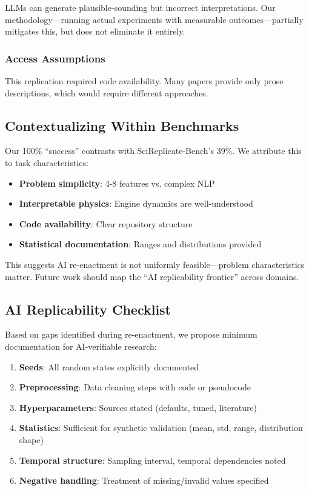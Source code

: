 \documentclass[conference]{IEEEtran}
\begin{document}
LLMs can generate plausible-sounding but incorrect interpretations. Our methodology---running actual experiments with measurable outcomes---partially mitigates this, but does not eliminate it entirely.

\subsubsection{Access Assumptions}

This replication required code availability. Many papers provide only prose descriptions, which would require different approaches.

\subsection{Contextualizing Within Benchmarks}

Our 100\% ``success'' contrasts with SciReplicate-Bench's 39\%. We attribute this to task characteristics:
\begin{itemize}
    \item \textbf{Problem simplicity}: 4-8 features vs. complex NLP
    \item \textbf{Interpretable physics}: Engine dynamics are well-understood
    \item \textbf{Code availability}: Clear repository structure
    \item \textbf{Statistical documentation}: Ranges and distributions provided
\end{itemize}

This suggests AI re-enactment is not uniformly feasible---problem characteristics matter. Future work should map the ``AI replicability frontier'' across domains.

\subsection{AI Replicability Checklist}

Based on gaps identified during re-enactment, we propose minimum documentation for AI-verifiable research:

\begin{enumerate}
    \item \textbf{Seeds}: All random states explicitly documented
    \item \textbf{Preprocessing}: Data cleaning steps with code or pseudocode
    \item \textbf{Hyperparameters}: Sources stated (defaults, tuned, literature)
    \item \textbf{Statistics}: Sufficient for synthetic validation (mean, std, range, distribution shape)
    \item \textbf{Temporal structure}: Sampling interval, temporal dependencies noted
    \item \textbf{Negative handling}: Treatment of missing/invalid values specified
\end{enumerate}
\end{document}

